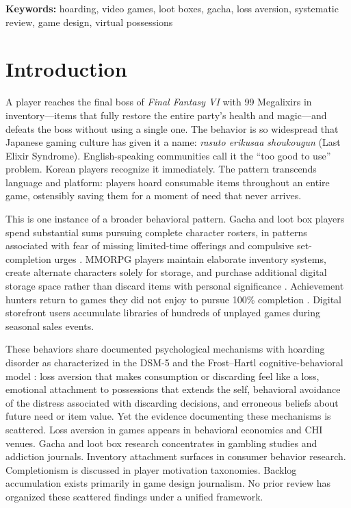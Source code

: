 \documentclass[12pt]{article}
\begin{document}
\noindent\textbf{Keywords:} hoarding, video games, loot boxes, gacha, loss aversion, systematic review, game design, virtual possessions

\section{Introduction}

A player reaches the final boss of \textit{Final Fantasy VI} with 99 Megalixirs in inventory---items that fully restore the entire party's health and magic---and defeats the boss without using a single one. The behavior is so widespread that Japanese gaming culture has given it a name: \textit{rasuto erikusaa shoukougun} (Last Elixir Syndrome). English-speaking communities call it the ``too good to use'' problem. Korean players recognize it immediately. The pattern transcends language and platform: players hoard consumable items throughout an entire game, ostensibly saving them for a moment of need that never arrives.

This is one instance of a broader behavioral pattern. Gacha and loot box players spend substantial sums pursuing complete character rosters, in patterns associated with fear of missing limited-time offerings and compulsive set-completion urges \citep{Zendle2023, Shibuya2019}. MMORPG players maintain elaborate inventory systems, create alternate characters solely for storage, and purchase additional digital storage space rather than discard items with personal significance \citep{Watkins2012}. Achievement hunters return to games they did not enjoy to pursue 100\% completion \citep{Kruse2016}. Digital storefront users accumulate libraries of hundreds of unplayed games during seasonal sales events.

These behaviors share documented psychological mechanisms with hoarding disorder as characterized in the DSM-5 \citep{APA2013} and the Frost--Hartl cognitive-behavioral model \citep{Frost1996}: loss aversion that makes consumption or discarding feel like a loss, emotional attachment to possessions that extends the self, behavioral avoidance of the distress associated with discarding decisions, and erroneous beliefs about future need or item value. Yet the evidence documenting these mechanisms is scattered. Loss aversion in games appears in behavioral economics and CHI venues. Gacha and loot box research concentrates in gambling studies and addiction journals. Inventory attachment surfaces in consumer behavior research. Completionism is discussed in player motivation taxonomies. Backlog accumulation exists primarily in game design journalism. No prior review has organized these scattered findings under a unified framework.
\end{document}
